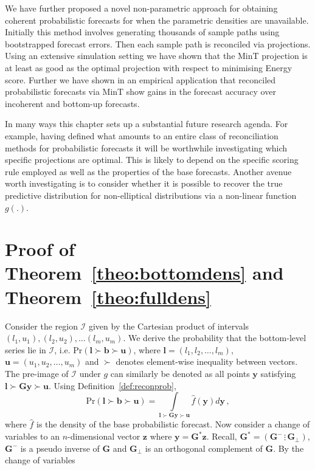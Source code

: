 \documentclass[12pt]{article}
\theoremstyle{definition}
\begin{document}
We have further proposed a novel non-parametric approach for obtaining coherent probabilistic forecasts for when the parametric densities are unavailable. Initially this method involves generating thousands of sample paths using bootstrapped forecast errors. Then each sample path is reconciled via projections. Using an extensive simulation setting we have shown that the MinT projection is at least as good as the optimal projection with respect to minimising Energy score. Further we have shown in an empirical application that reconciled probabilistic forecasts via MinT show gains in the forecast accuracy over incoherent and bottom-up forecasts.


In many ways this chapter sets up a substantial future research agenda. For example, having defined what amounts to an entire class of reconciliation methods for probabilistic forecasts it will be worthwhile investigating which specific projections are optimal. This is likely to depend on the specific scoring rule employed as well as the properties of the base forecasts. Another avenue worth investigating is to consider whether it is possible to recover the true predictive distribution for non-elliptical distributions via a non-linear function $g(.)$.

\newpage

\appendix

\section{Proof of Theorem~\ref{theo:bottomdens} and Theorem~\ref{theo:fulldens}} \label{app:Bottom&FullDens}

Consider the region $\mathcal{I}$ given by the Cartesian product of intervals $(l_1,u_1),(l_2,u_2),\ldots(l_m,u_m)$.  We derive the probability that the bottom-level series lie in $\mathcal{I}$, i.e. $\mbox{Pr}(\bm{l}\succ\bm{b}\succ\bm{u})$, where ${\bm l}=(l_1,l_2,\ldots,l_m)$, ${\bm u}=(u_1,u_2,\ldots,u_m)$ and $\succ$ denotes element-wise inequality between vectors.  The pre-image of $\mathcal{I}$ under $g$ can similarly be denoted as all points ${\bm y}$ satisfying $\bm{l}\succ\bm{G}\bm{y}\succ\bm{u}$.  Using Definition~\ref{def:reconprob},
\[
\mbox{Pr}(\bm{l}\succ\bm{b}\succ\bm{u})=\int\limits_{\bm{l}\succ\bm{G}\bm{y}\succ\bm{u}}\hat{f}(\bm{y})d{\bm y}\,,
\]
where $\hat{f}$ is the density of the base probabilistic forecast.  Now consider a change of variables to an $n$-dimensional vector ${\bm z}$ where $\bm{y}={\bm G^*}{\bm z}$. Recall, ${\bm G^*}=\left({\bm G^{-}}\,\vdots\,{\bm G_\perp}\right)$, ${\bm G^{-}}$ is a pseudo inverse of $\bm{G}$ and ${\bm G_\perp}$ is an orthogonal complement of $\bm{G}$.  By the change of variables
\end{document}
